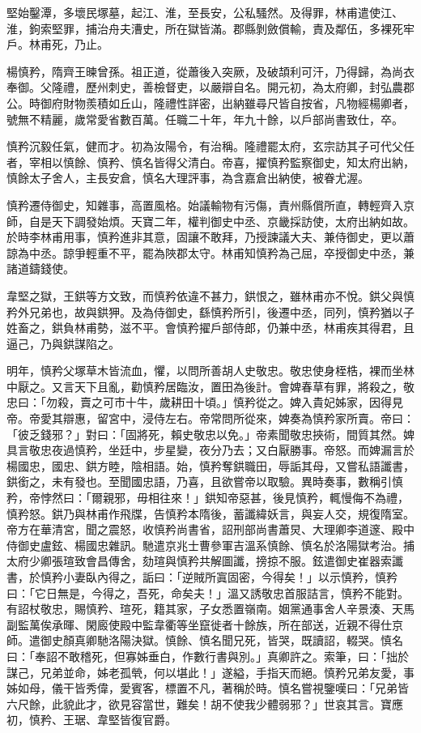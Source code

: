 \begin{pinyinscope}
 堅始鑿潭，多壞民塚墓，起江、淮，至長安，公私騷然。及得罪，林甫遣使江、淮，鉤索堅罪，捕治舟夫漕史，所在獄皆滿。郡縣剝斂償輸，責及鄰伍，多裸死牢戶。林甫死，乃止。



 楊慎矜，隋齊王暕曾孫。祖正道，從蕭後入突厥，及破頡利可汗，乃得歸，為尚衣奉御。父隆禮，歷州刺史，善檢督吏，以嚴辯自名。開元初，為太府卿，封弘農郡公。時御府財物羨積如丘山，隆禮性詳密，出納雖尋尺皆自按省，凡物經楊卿者，號無不精麗，歲常愛省數百萬。任職二十年，年九十餘，以戶部尚書致仕，卒。



 慎矜沉毅任氣，健而才。初為汝陽令，有治稱。隆禮罷太府，玄宗訪其子可代父任者，宰相以慎餘、慎矜、慎名皆得父清白。帝喜，擢慎矜監察御史，知太府出納，慎餘太子舍人，主長安倉，慎名大理評事，為含嘉倉出納使，被眷尤渥。



 慎矜遷侍御史，知雜事，高置風格。始議輸物有污傷，責州縣償所直，轉輕齊入京師，自是天下調發始煩。天寶二年，權判御史中丞、京畿採訪使，太府出納如故。於時李林甫用事，慎矜進非其意，固讓不敢拜，乃授諫議大夫、兼侍御史，更以蕭諒為中丞。諒爭輕重不平，罷為陜郡太守。林甫知慎矜為己屈，卒授御史中丞，兼諸道鑄錢使。



 韋堅之獄，王鉷等方文致，而慎矜依違不甚力，鉷恨之，雖林甫亦不悅。鉷父與慎矜外兄弟也，故與鉷狎。及為侍御史，繇慎矜所引，後遷中丞，同列，慎矜猶以子姓畜之，鉷負林甫勢，滋不平。會慎矜擢戶部侍郎，仍兼中丞，林甫疾其得君，且逼己，乃與鉷謀陷之。



 明年，慎矜父塚草木皆流血，懼，以問所善胡人史敬忠。敬忠使身桎梏，裸而坐林中厭之。又言天下且亂，勸慎矜居臨汝，置田為後計。會婢春草有罪，將殺之，敬忠曰：「勿殺，賣之可市十牛，歲耕田十頃。」慎矜從之。婢入貴妃姊家，因得見帝。帝愛其辯惠，留宮中，浸侍左右。帝常問所從來，婢奏為慎矜家所賣。帝曰：「彼乏錢邪？」對曰：「固將死，賴史敬忠以免。」帝素聞敬忠挾術，間質其然。婢具言敬忠夜過慎矜，坐廷中，步星變，夜分乃去；又白厭勝事。帝怒。而婢漏言於楊國忠，國忠、鉷方睦，陰相語。始，慎矜奪鉷職田，辱詬其母，又嘗私語讖書，鉷銜之，未有發也。至聞國忠語，乃喜，且欲嘗帝以取驗。異時奏事，數稱引慎矜，帝悖然曰：「爾親邪，毋相往來！」鉷知帝惡甚，後見慎矜，輒慢侮不為禮，慎矜怒。鉷乃與林甫作飛牒，告慎矜本隋後，蓄讖緯妖言，與妄人交，規復隋室。帝方在華清宮，聞之震怒，收慎矜尚書省，詔刑部尚書蕭炅、大理卿李道邃、殿中侍御史盧鉉、楊國忠雜訊。馳遣京兆士曹參軍吉溫系慎餘、慎名於洛陽獄考治。捕太府少卿張瑄致會昌傳舍，劾瑄與慎矜共解圖讖，搒掠不服。鉉遣御史崔器索讖書，於慎矜小妻臥內得之，詬曰：「逆賊所寘固密，今得矣！」以示慎矜，慎矜曰：「它日無是，今得之，吾死，命矣夫！」溫又誘敬忠首服詰言，慎矜不能對。有詔杖敬忠，賜慎矜、瑄死，籍其家，子女悉置嶺南。姻黨通事舍人辛景湊、天馬副監萬俟承暉、閑廄使殿中監韋衢等坐竄徙者十餘族，所在部送，近親不得仕京師。遣御史顏真卿馳洛陽決獄。慎餘、慎名聞兄死，皆哭，既讀詔，輟哭。慎名曰：「奉詔不敢稽死，但寡姊垂白，作數行書與別。」真卿許之。索筆，曰：「拙於謀己，兄弟並命，姊老孤煢，何以堪此！」遂縊，手指天而絕。慎矜兄弟友愛，事姊如母，儀干皆秀偉，愛賓客，標置不凡，著稱於時。慎名嘗視鑒嘆曰：「兄弟皆六尺餘，此貌此才，欲見容當世，難矣！胡不使我少體弱邪？」世哀其言。寶應初，慎矜、王琚、韋堅皆復官爵。




\end{pinyinscope}
